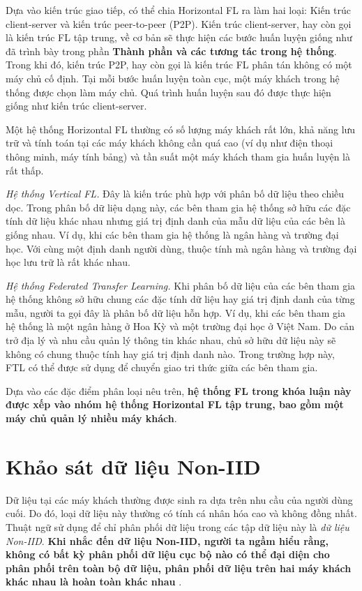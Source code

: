Dựa vào kiến trúc giao tiếp, có thể chia Horizontal FL ra làm hai loại: Kiến trúc client-server và kiến trúc peer-to-peer (P2P). Kiến trúc client-server, hay còn gọi là kiến trúc FL tập trung, về cơ bản sẽ thực hiện các bước huấn luyện giống như đã trình bày trong phần \textbf{Thành phần và các tương tác trong hệ thống}. Trong khi đó, kiến trúc P2P, hay còn gọi là kiến trúc FL phân tán không có một máy chủ cố định. Tại mỗi bước huấn luyện toàn cục, một máy khách trong hệ thống được chọn làm máy chủ. Quá trình huấn luyện sau đó được thực hiện giống như kiến trúc client-server.

Một hệ thống Horizontal FL thường có số lượng máy khách rất lớn, khả năng lưu trữ và tính toán tại các máy khách không cần quá cao (ví dụ như điện thoại thông minh, máy tính bảng) và tần suất một máy khách tham gia huấn luyện là rất thấp.

\textit{Hệ thống Vertical FL.} Đây là kiến trúc phù hợp với phân bố dữ liệu theo chiều dọc. Trong phân bố dữ liệu dạng này, các bên tham gia hệ thống sở hữu các đặc tính dữ liệu khác nhau nhưng giá trị định danh của mẫu dữ liệu của các bên là giống nhau. Ví dụ, khi các bên tham gia hệ thống là ngân hàng và trường đại học. Với cùng một định danh người dùng, thuộc tính mà ngân hàng và trường đại học lưu trữ là rất khác nhau.

\textit{Hệ thống Federated Transfer Learning.} Khi phân bố dữ liệu của các bên tham gia hệ thống không sở hữu chung các đặc tính dữ liệu hay giá trị định danh của từng mẫu, người ta gọi đây là phân bố dữ liệu hỗn hợp. Ví dụ, khi các bên tham gia hệ thống là một ngân hàng ở Hoa Kỳ và một trường đại học ở Việt Nam. Do cản trở địa lý và nhu cầu quản lý thông tin khác nhau, chủ sở hữu dữ liệu này sẽ không có chung thuộc tính hay giá trị định danh nào. Trong trường hợp này, FTL có thể được sử dụng để chuyển giao tri thức giữa các bên tham gia.

Dựa vào các đặc điểm phân loại nêu trên, \textbf{hệ thống FL trong khóa luận này được xếp vào nhóm hệ thống Horizontal FL tập trung, bao gồm một máy chủ quản lý nhiều máy khách}.

\section{Khảo sát dữ liệu Non-IID}

Dữ liệu tại các máy khách thường được sinh ra dựa trên nhu cầu của người dùng cuối. Do đó, loại dữ liệu này thường có tính cá nhân hóa cao và không đồng nhất. Thuật ngữ sử dụng để chỉ phân phối dữ liệu trong các tập dữ liệu này là \textit{dữ liệu Non-IID}. \textbf{Khi nhắc đến dữ liệu Non-IID, người ta ngầm hiểu rằng, không có bất kỳ phân phối dữ liệu cục bộ nào có thể đại diện cho phân phối trên toàn bộ dữ liệu, phân phối dữ liệu trên hai máy khách khác nhau là hoàn toàn khác nhau} \cite{zhu2021federated}.

